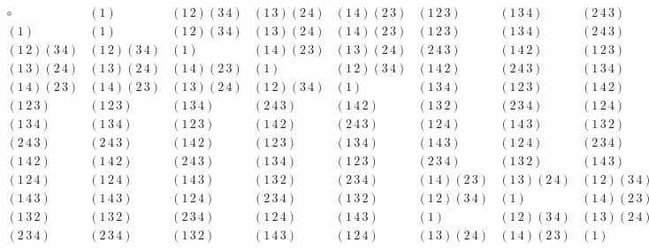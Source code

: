 \documentclass{standalone}
\begin{document}
$
\begin{array}{c|c|c|c|c|c|c|c|c|c|c|c|c}
  \circ    & (1) & (1\,2)(3\,4) & (1\,3)(2\,4) & (1\,4)(2\,3) & (1\,2\,3) & (1\,3\,4)&(2\,4\,3)&(1\,4\,2)&(1\,2\,4)&(1\,4\,3)&(1\,3\,2)&(2\,3\,4)  \\ \hline
(1) & (1) & (1\,2)(3\,4) & (1\,3)(2\,4) & (1\,4)(2\,3) & (1\,2\,3) & (1\,3\,4)&(2\,4\,3)&(1\,4\,2)&(1\,2\,4)&(1\,4\,3)&(1\,3\,2)&(2\,3\,4)  \\ \hline
(1\,2)(3\,4) &(1\,2)(3\,4)&(1)&(1\,4)(2\,3)&(1\,3)(2\,4)&(2\,4\,3)& (1\,4\,2) &  (1\,2\,3) &  (1\,3\,4) & (2\,3\,4) & (1\,3\,2) & (1\,4\,3) &  (1\,2\,4) \\ \hline
(1\,3)(2\,4)& (1\,3)(2\,4)&(1\,4)(2\,3)&(1)&(1\,2)(3\,4)& (1\,4\,2)& (2\,4\,3)& (1\,3\,4)& (1\,2\,3)& (1\,4\,3)& (1\,2\,4)& (2\,3\,4) & (1\,3\,2) \\ \hline
(1\,4)(2\,3) &(1\,4)(2\,3)&(1\,3)(2\,4)&(1\,2)(3\,4)&(1)& (1\,3\,4)& (1\,2\,3)& (1\,4\,2)& (2\,4\,3)& (1\,3\,2)& (2\,3\,4) &  (1\,2\,4) & (1\,4\,3) \\ \hline
(1\,2\,3) &(1\,2\,3) & (1\,3\,4)&(2\,4\,3)&(1\,4\,2)& (1\,3\,2)& (2\,3\,4) & (1\,2\,4) & (1\,4\,3) &  (1\,3)(2\,4) & (1\,4)(2\,3) & (1) & (1\,2)(3\,4) \\ \hline
(1\,3\,4) & (1\,3\,4) & (1\,2\,3) &(1\,4\,2)& (2\,4\,3)& (1\,2\,4)& (1\,4\,3) &(1\,3\,2)& (2\,3\,4)& (1\,2)(3\,4)& (1) &(1\,4)(2\,3)& (1\,3)(2\,4)       \\ \hline
(2\,4\,3) & (2\,4\,3) & (1\,4\,2) & (1\,2\,3) & (1\,3\,4) & (1\,4\,3) & (1\,2\,4) & (2\,3\,4) & (1\,3\,2) & (1\,4)(2\,3) & (1\,3)(4\,2) & (1\,2)(3\,4) & (1)  \\ \hline
(1\,4\,2)& (1\,4\,2) & (2\,4\,3) & (1\,3\,4) & (1\,2\,3) & (2\,3\,4) & (1\,3\,2) & (1\,4\,3) & (1\,2\,4) & (1) &(1\,2)(3\,4) &(1\,3)(4\,2) &(1\,4)(2\,3)\\ \hline
(1\,2\,4)&(1\,2\,4)&(1\,4\,3)&(1\,3\,2)&(2\,3\,4) & (1\,4)(2\,3)& (1\,3)(2\,4) & (1\,2)(3\,4) & (1) & (1\,4\,2) & (2\,4\,3) & (1\,3\,4) & (1\,2\,3) \\ \hline
(1\,4\,3)&(1\,4\,3)& (1\,2\,4) & (2\,3\,4) & (1\,3\,2) & (1\,2)(3\,4) & (1) & (1\,4)(2\,3) & (1\,3)(2\,4)& (1\,2\,3) & (1\,3\,4) & (2\,4\,3) & (1\,4\,2) \\ \hline
(1\,3\,2)&(1\,3\,2)& (2\,3\,4) & (1\,2\,4) & (1\,4\,3) & (1) & (1\,2)(3\,4) & (1\,3)(2\,4) & (1\,4)(2\,3) & (2\,4\,3) & (1\,4\,2) & (1\,2\,3) & (1\,3\,4)  \\ \hline
(2\,3\,4)&(2\,3\,4)& (1\,3\,2) & (1\,4\,3) & (1\,2\,4) & (1\,3)(2\,4) & (1\,4)(2\,3) & (1) & (1\,2)(3\,4) & (1\,3\,4) & (1\,2\,3) & (1\,4\,2) & (2\,4\,3)
\end{array}
$
\end{document}
